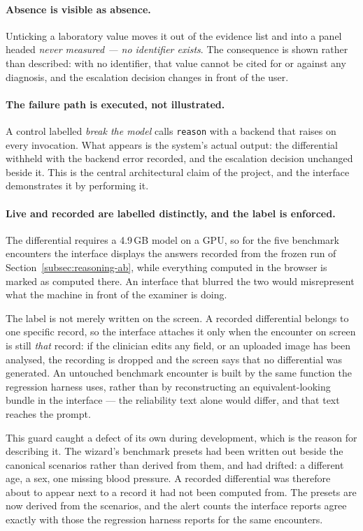 \paragraph{Absence is visible as absence.} Unticking a laboratory value moves it out of the
evidence list and into a panel headed \emph{never measured --- no identifier exists}. The
consequence is shown rather than described: with no identifier, that value cannot be cited for
or against any diagnosis, and the escalation decision changes in front of the user.

\paragraph{The failure path is executed, not illustrated.} A control labelled \emph{break the
model} calls \texttt{reason} with a backend that raises on every invocation. What appears is
the system's actual output: the differential withheld with the backend error recorded, and the
escalation decision unchanged beside it. This is the central architectural claim of the project,
and the interface demonstrates it by performing it.

\paragraph{Live and recorded are labelled distinctly, and the label is enforced.} The
differential requires a 4.9\,GB model on a GPU, so for the five benchmark encounters the
interface displays the answers recorded from the frozen run of
Section~\ref{subsec:reasoning-ab}, while everything computed in the browser is marked as
computed there. An interface that blurred the two would misrepresent what the machine in front
of the examiner is doing.

The label is not merely written on the screen. A recorded differential belongs to one specific
record, so the interface attaches it only when the encounter on screen is still \emph{that}
record: if the clinician edits any field, or an uploaded image has been analysed, the recording
is dropped and the screen says that no differential was generated. An untouched benchmark
encounter is built by the same function the regression harness uses, rather than by
reconstructing an equivalent-looking bundle in the interface --- the reliability text alone
would differ, and that text reaches the prompt.

This guard caught a defect of its own during development, which is the reason for describing
it. The wizard's benchmark presets had been written out beside the canonical scenarios rather
than derived from them, and had drifted: a different age, a sex, one missing blood pressure. A
recorded differential was therefore about to appear next to a record it had not been computed
from. The presets are now derived from the scenarios, and the alert counts the interface
reports agree exactly with those the regression harness reports for the same encounters.

